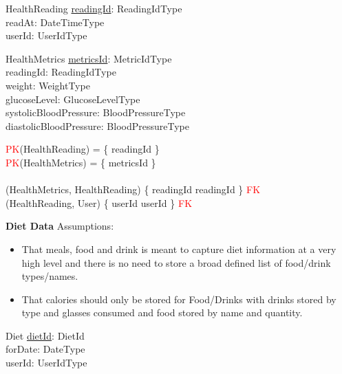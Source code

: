 \documentclass{article}
\begin{document}
\begin{schema}{HealthReading}
	\underline{readingId}: ReadingIdType \\
    readAt: DateTimeType \\
    userId: UserIdType \\
\end{schema}

\begin{schema}{HealthMetrics}
    \underline{metricsId}: MetricIdType \\
    readingId: ReadingIdType \\
    weight: WeightType \\ 
    glucoseLevel: GlucoseLevelType \\
    systolicBloodPressure: BloodPressureType \\
    diastolicBloodPressure: BloodPressureType \\
\end{schema}

\begin{zed}
\textcolor{red}{PK}(HealthReading) = \{ readingId \} \\ 
\textcolor{red}{PK}(HealthMetrics) = \{ metricsId \} \\
\newline \\ 
(HealthMetrics, HealthReading) \mapsto \{ readingId \mapsto readingId \} \in \textcolor{red}{FK} \\
(HealthReading, User) \mapsto \{ userId \mapsto userId \} \in \textcolor{red}{FK} \\
\end{zed}
    
\hspace{-0.5cm}\textbf{Diet Data}
\newline \newline Assumptions:
\begin{itemize}
  \item That meals, food and drink is meant to capture diet information at a very high level and there is no need to store a broad defined list of food/drink types/names. 
  \item That calories should only be stored for Food/Drinks with drinks stored by type and glasses consumed and food stored by name and quantity.
\end{itemize}

\begin{schema}{Diet}
    \underline{dietId}: DietId \\
    forDate: DateType \\
    userId: UserIdType \\
\end{schema}
\end{document}
